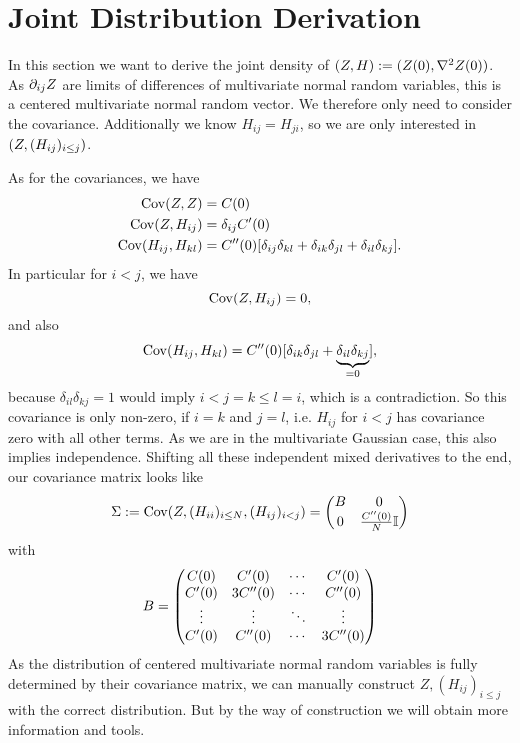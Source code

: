 \section{Joint Distribution Derivation}


In this section we want to derive the joint density of \((Z, H):=
(Z(0), \nabla^2Z(0))\). As \(\partial_{ij}Z\) are limits of differences
of multivariate normal random variables, this is a centered multivariate normal
random vector. We therefore only need to consider the covariance. Additionally
we know \(H_{ij} = H_{ji}\), so we are only interested
in \((Z, (H_{ij})_{i\le j})\).

As for the covariances, we have 
\begin{align*}
	\operatorname{Cov}(Z,Z) &= C(0)\\
	\operatorname{Cov}(Z, H_{ij}) &= \delta_{ij} C'(0)\\
	\operatorname{Cov}(H_{ij}, H_{kl}) &= C''(0)
	[\delta_{ij}\delta_{kl} + \delta_{ik}\delta_{jl} + \delta_{il}\delta_{kj}].
\end{align*}
In particular for \(i<j\), we have
\[
	\operatorname{Cov}(Z, H_{ij}) = 0,
\]
and also
\[
	\operatorname{Cov}(H_{ij}, H_{kl}) = C''(0)
	[\delta_{ik}\delta_{jl} + \underbrace{\delta_{il}\delta_{kj}}_{=0}],
\]
because \(\delta_{il}\delta_{kj}=1\) would imply \(i < j = k \le l = i\), which
is a contradiction. So this covariance is only non-zero, if \(i=k\) and \(j=l\),
i.e. \(H_{ij}\) for \(i<j\) has covariance zero with all other terms.
As we are in the multivariate Gaussian case, this also implies independence.
Shifting all these independent mixed derivatives to the end, our covariance
matrix looks like
\[
	\Sigma := \operatorname{Cov}(Z, (H_{ii})_{i\le N}, (H_{ij})_{i<j})
	= \begin{pmatrix}
		B & 0\\
		0 & \frac{C''(0)}{N}\mathbb{I}
	\end{pmatrix}
\]
with
\[
	B = \begin{pmatrix}
		C(0) & C'(0)	& \cdots & C'(0) \\
		C'(0) & 3C''(0) &  \cdots & C''(0) \\
		\vdots & \vdots & \ddots & \vdots \\
		C'(0) & C''(0) & \cdots &  3 C''(0)
	\end{pmatrix}
\]
As the distribution of centered multivariate normal random variables is fully
determined by their covariance matrix, we can manually construct
\(Z,(H_{ij})_{i\le j}\) with the correct distribution. But by the way of
construction we will obtain more information and tools.

